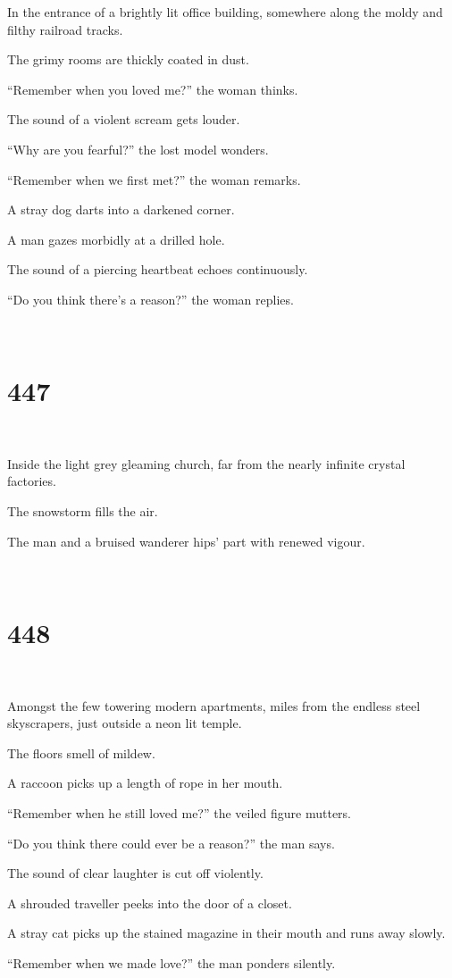 \documentclass{report}
\begin{document}
In the entrance of a brightly lit office building, somewhere along the moldy and filthy railroad tracks.

The grimy rooms are thickly coated in dust.

``Remember when you loved me?'' the woman thinks.

The sound of a violent scream gets louder.

``Why are you fearful?'' the lost model wonders.

``Remember when we first met?'' the woman remarks.

A stray dog darts into a darkened corner.

A man gazes morbidly at a drilled hole.

The sound of a piercing heartbeat echoes continuously.

``Do you think there's a reason?'' the woman replies.

~
\chapter*{447}
~

Inside the light grey gleaming church, far from the nearly infinite crystal factories.

The snowstorm fills the air.

The man and a bruised wanderer hips' part with renewed vigour.

~
\chapter*{448}
~

Amongst the few towering modern apartments, miles from the endless steel skyscrapers, just outside a neon lit temple.

The floors smell of mildew.

A raccoon picks up a length of rope in her mouth.

``Remember when he still loved me?'' the veiled figure mutters.

``Do you think there could ever be a reason?'' the man says.

The sound of clear laughter is cut off violently.

A shrouded traveller peeks into the door of a closet.

A stray cat picks up the stained magazine in their mouth and runs away slowly.

``Remember when we made love?'' the man ponders silently.
\end{document}
